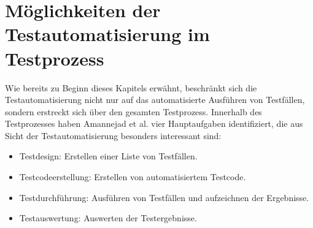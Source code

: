 \section{Möglichkeiten der Testautomatisierung im Testprozess}
\label{sec:bereiche_der_testautomatisierung}
Wie bereits zu Beginn dieses Kapitels erwähnt, beschränkt sich die Testautomatisierung nicht nur auf das automatisierte Ausführen von Testfällen, sondern erstreckt sich über den gesamten Testprozess. Innerhalb des Testprozesses haben Amannejad et al. \cite{amannejad_search-based_2014} vier Hauptaufgaben identifiziert, die aus Sicht der Testautomatisierung besonders interessant sind:

\begin{itemize}
\item Testdesign: Erstellen einer Liste von Testfällen.
\item Testcodeerstellung: Erstellen von automatisiertem Testcode.
\item Testdurchführung: Ausführen von Testfällen und aufzeichnen der Ergebnisse.
\item Testauswertung: Auswerten der Testergebnisse.
\end{itemize}

